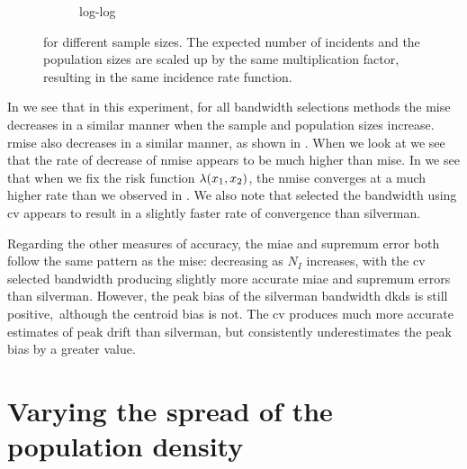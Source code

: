\begin{figure}[htbp]
\begin{subfigure}[b]{0.49\textwidth}
        \caption{ log-log}
        \label{fig:ise:unifNpop_1h:nmise_log_log}
    \end{subfigure}
    \caption[: by incident and population size]
        { for different sample sizes.
        The expected number of incidents and the population sizes are scaled up by the same multiplication factor,
        resulting in the same incidence rate function.
        \errorplotcaption}
    \label{fig:ise:unifNpop_1h}
\end{figure}

In  we see that in this experiment,
for all bandwidth selections methods the \gls{mise} decreases in a similar manner when the sample and population sizes increase.
\Gls{rmise} also decreases in a similar manner, as shown in .
When we look at  we see that the rate of decrease of \gls{nmise} appears to be much higher than \gls{mise}.
In  we see that when we fix the risk function $\lambda (x_1, x_2)$,
the \gls{nmise} converges at a much higher rate than we observed in .
We also note that selected the bandwidth using \gls{cv} appears to result in a slightly faster rate of convergence than \gls{silverman}.



Regarding the other measures of accuracy, the \gls{miae} and \gls{supremum error} both follow the same pattern as the \gls{mise}:
decreasing as $N_I$ increases,
with the \gls{cv} selected bandwidth producing slightly more accurate \gls{miae} and \glspl{supremum error} than \gls{silverman}.
However, the \gls{peak bias} of the \gls{silverman} bandwidth \glspl{dkd} is still positive,\
although the \gls{centroid bias} is not.
The \gls{cv} produces much more accurate estimates of \gls{peak drift} than \gls{silverman},
but consistently underestimates the \gls{peak bias} by a greater value.

\section{Varying the spread of the population density}
\label{sec:results:pop_spread}

